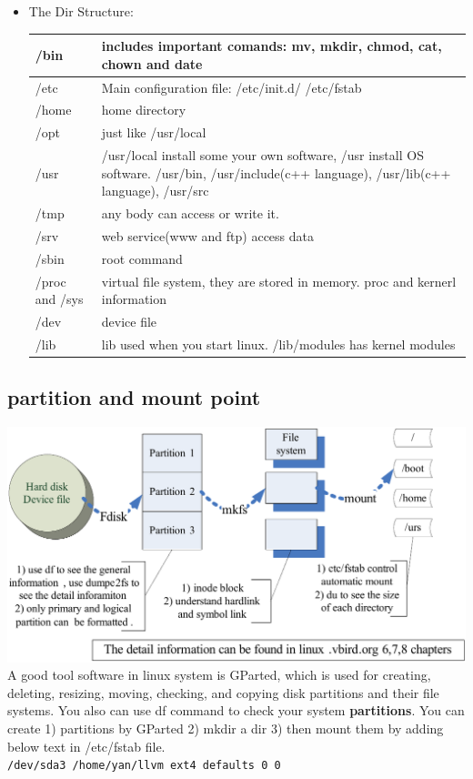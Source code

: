 \documentclass[a4paper,12pt,twoside]{book}
\begin{document}
\begin{itemize}
     \item The Dir Structure:
\begin{tabular}{|p{}|p{}|}
  \hline
  /bin & includes important comands: mv, mkdir, chmod, cat, chown and date  \\
 \hline  /etc & Main configuration file: /etc/init.d/ /etc/fstab \\
  \hline /home & home directory \\
  \hline /opt & just like /usr/local  \\
  \hline /usr & /usr/local install some your own software, /usr install OS software.  /usr/bin, /usr/include(c++ language), /usr/lib(c++ language),  /usr/src \\
  \hline /tmp & any body can access or write it.     \\
  \hline /srv & web service(www and ftp) access data \\
  \hline /sbin & root command \\
  \hline /proc and /sys & virtual file system, they are stored in memory.  proc and kernerl information \\
  \hline /dev & device file \\
  \hline /lib & lib used when you start linux. /lib/modules has kernel modules \\
  \hline 
\end{tabular}

\end{itemize} 
\subsection{partition and mount point}
	\includegraphics[scale=0.8]{pics/basic_file_system_clip}
	\\ 
   A good tool software in linux system is GParted, which  is used for creating, deleting, resizing, moving, checking, and copying disk partitions and their file systems.  You also can use df command to check your system \textbf{partitions}. You can create 1) partitions by GParted 2) mkdir a dir 3) then mount them by adding below text in /etc/fstab file.    \\   
   \verb=/dev/sda3 /home/yan/llvm ext4 defaults 0 0=
   
\end{document}

